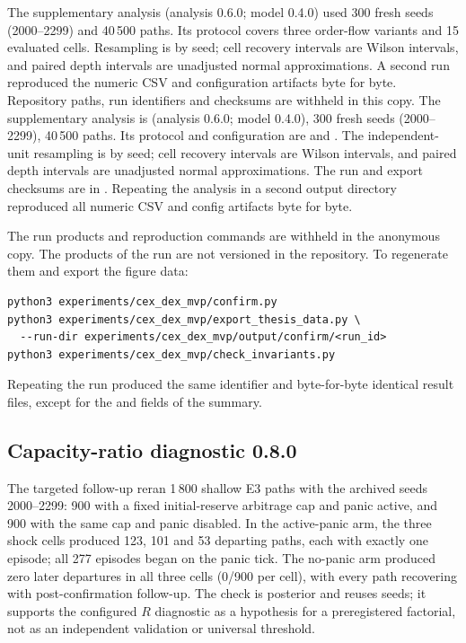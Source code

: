 \ifdefined\blindreviewmode
The supplementary analysis (analysis 0.6.0; model 0.4.0) used 300 fresh seeds (2000--2299) and 40\,500 paths. Its protocol covers three order-flow variants and 15 evaluated cells. Resampling is by seed; cell recovery intervals are Wilson intervals, and paired depth intervals are unadjusted normal approximations. A second run reproduced the numeric CSV and configuration artifacts byte for byte. Repository paths, run identifiers and checksums are withheld in this copy.
\else
The supplementary analysis is  (analysis 0.6.0; model 0.4.0), 300 fresh seeds (2000--2299), 40\,500 paths. Its protocol and configuration are  and . The independent-unit resampling is by seed; cell recovery intervals are Wilson intervals, and paired depth intervals are unadjusted normal approximations. The run and export checksums are in . Repeating the analysis in a second output directory reproduced all numeric CSV and config artifacts byte for byte.

\fi
\ifdefined\blindreviewmode
The run products and reproduction commands are withheld in the anonymous copy.
\else
The products of the run are not versioned in the repository. To regenerate them and export the figure data:

\begin{verbatim}
python3 experiments/cex_dex_mvp/confirm.py
python3 experiments/cex_dex_mvp/export_thesis_data.py \
  --run-dir experiments/cex_dex_mvp/output/confirm/<run_id>
python3 experiments/cex_dex_mvp/check_invariants.py
\end{verbatim}
\fi

Repeating the run produced the same identifier and byte-for-byte identical result files, except for the  and  fields of the summary.

\subsection*{Capacity-ratio diagnostic 0.8.0}

The targeted follow-up reran 1\,800 shallow E3 paths with the archived seeds 2000--2299: 900 with a fixed initial-reserve arbitrage cap and panic active, and 900 with the same cap and panic disabled. In the active-panic arm, the three shock cells produced 123, 101 and 53 departing paths, each with exactly one episode; all 277 episodes began on the panic tick. The no-panic arm produced zero later departures in all three cells (0/900 per cell), with every path recovering with post-confirmation follow-up. The check is posterior and reuses seeds; it supports the configured $R$ diagnostic as a hypothesis for a preregistered factorial, not as an independent validation or universal threshold.

